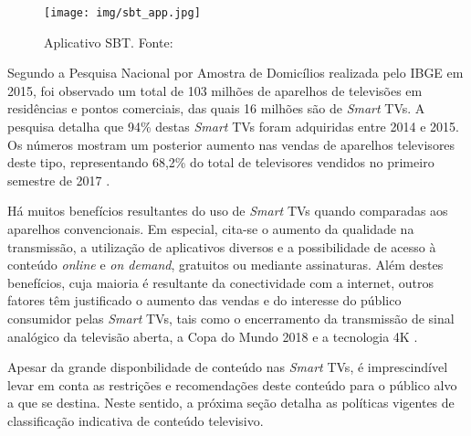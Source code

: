 \begin{figure}[h!]
	\texttt{[image: img/sbt\_app.jpg]}
	\caption{Aplicativo SBT. Fonte: \cite{sbt:tvconectada}}
	\label{fig:sbt_app}
\end{figure}

Segundo a Pesquisa Nacional por Amostra de Domicílios realizada pelo IBGE em 2015, foi observado um total de 103 milhões de aparelhos de televisões em residências e pontos comerciais, das quais 16 milhões são de \emph{Smart} TVs. A pesquisa detalha que 94\% destas \emph{Smart} TVs foram adquiridas entre 2014 e 2015. Os números mostram um posterior aumento nas vendas de aparelhos televisores deste tipo, representando 68,2\% do total de televisores vendidos no primeiro semestre de 2017 \cite{pnad2015}.

Há muitos benefícios resultantes do uso de \emph{Smart} TVs quando comparadas aos aparelhos convencionais. Em especial, cita-se o aumento da qualidade na transmissão, a utilização de aplicativos diversos e a possibilidade de acesso à conteúdo \emph{online} e \emph{on demand}, gratuitos ou mediante assinaturas. Além destes benefícios, cuja maioria é resultante da conectividade com a internet, outros fatores têm justificado o aumento das vendas e do interesse do público consumidor pelas \emph{Smart} TVs, tais como o encerramento da transmissão de sinal analógico da televisão aberta, a Copa do Mundo 2018 e a tecnologia 4K \cite{leiajabuscasmart,correiopnad,estadao:explosaovideosonline}.

Apesar da grande disponbilidade de conteúdo nas \emph{Smart} TVs, é imprescindível levar em conta as restrições e recomendações deste conteúdo para o público alvo a que se destina. Neste sentido, a próxima seção detalha as políticas vigentes de classificação indicativa de conteúdo televisivo.
